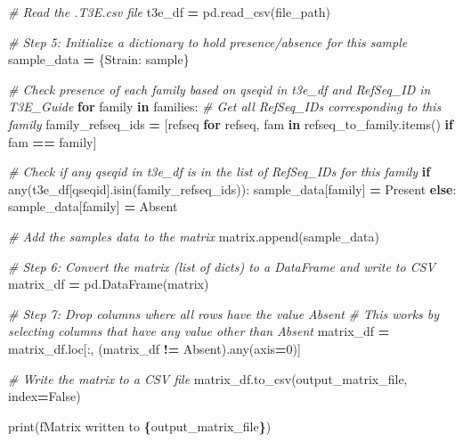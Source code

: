 \documentclass[
]{book}
\newenvironment{Shaded}{\begin{snugshade}}{\end{snugshade}}
\newcommand{\BuiltInTok}[1]{#1}
\newcommand{\CommentTok}[1]{\textcolor[rgb]{0.56,0.35,0.01}{\textit{#1}}}
\newcommand{\ControlFlowTok}[1]{\textcolor[rgb]{0.13,0.29,0.53}{\textbf{#1}}}
\newcommand{\DecValTok}[1]{\textcolor[rgb]{0.00,0.00,0.81}{#1}}
\newcommand{\KeywordTok}[1]{\textcolor[rgb]{0.13,0.29,0.53}{\textbf{#1}}}
\newcommand{\NormalTok}[1]{#1}
\newcommand{\OperatorTok}[1]{\textcolor[rgb]{0.81,0.36,0.00}{\textbf{#1}}}
\newcommand{\SpecialCharTok}[1]{\textcolor[rgb]{0.81,0.36,0.00}{\textbf{#1}}}
\newcommand{\SpecialStringTok}[1]{\textcolor[rgb]{0.31,0.60,0.02}{#1}}
\newcommand{\StringTok}[1]{\textcolor[rgb]{0.31,0.60,0.02}{#1}}
\newcommand{\VariableTok}[1]{\textcolor[rgb]{0.00,0.00,0.00}{#1}}
\begin{document}
\begin{Shaded}
\begin{Highlighting}[]
        \CommentTok{\# Read the .T3E.csv file}
\NormalTok{        t3e\_df }\OperatorTok{=}\NormalTok{ pd.read\_csv(file\_path)}
        
        \CommentTok{\# Step 5: Initialize a dictionary to hold presence/absence for this sample}
\NormalTok{        sample\_data }\OperatorTok{=}\NormalTok{ \{}\StringTok{\textquotesingle{}Strain\textquotesingle{}}\NormalTok{: sample\}}
        
        \CommentTok{\# Check presence of each family based on qseqid in t3e\_df and RefSeq\_ID in T3E\_Guide}
        \ControlFlowTok{for}\NormalTok{ family }\KeywordTok{in}\NormalTok{ families:}
            \CommentTok{\# Get all RefSeq\_IDs corresponding to this family}
\NormalTok{            family\_refseq\_ids }\OperatorTok{=}\NormalTok{ [refseq }\ControlFlowTok{for}\NormalTok{ refseq, fam }\KeywordTok{in}\NormalTok{ refseq\_to\_family.items() }\ControlFlowTok{if}\NormalTok{ fam }\OperatorTok{==}\NormalTok{ family]}
            
            \CommentTok{\# Check if any qseqid in t3e\_df is in the list of RefSeq\_IDs for this family}
            \ControlFlowTok{if} \BuiltInTok{any}\NormalTok{(t3e\_df[}\StringTok{\textquotesingle{}qseqid\textquotesingle{}}\NormalTok{].isin(family\_refseq\_ids)):}
\NormalTok{                sample\_data[family] }\OperatorTok{=} \StringTok{\textquotesingle{}Present\textquotesingle{}}
            \ControlFlowTok{else}\NormalTok{:}
\NormalTok{                sample\_data[family] }\OperatorTok{=} \StringTok{\textquotesingle{}Absent\textquotesingle{}}
        
        \CommentTok{\# Add the sample\textquotesingle{}s data to the matrix}
\NormalTok{        matrix.append(sample\_data)}

\CommentTok{\# Step 6: Convert the matrix (list of dicts) to a DataFrame and write to CSV}
\NormalTok{matrix\_df }\OperatorTok{=}\NormalTok{ pd.DataFrame(matrix)}

\CommentTok{\# Step 7: Drop columns where all rows have the value \textquotesingle{}Absent\textquotesingle{}}
\CommentTok{\# This works by selecting columns that have any value other than \textquotesingle{}Absent\textquotesingle{}}
\NormalTok{matrix\_df }\OperatorTok{=}\NormalTok{ matrix\_df.loc[:, (matrix\_df }\OperatorTok{!=} \StringTok{\textquotesingle{}Absent\textquotesingle{}}\NormalTok{).}\BuiltInTok{any}\NormalTok{(axis}\OperatorTok{=}\DecValTok{0}\NormalTok{)]}

\CommentTok{\# Write the matrix to a CSV file}
\NormalTok{matrix\_df.to\_csv(output\_matrix\_file, index}\OperatorTok{=}\VariableTok{False}\NormalTok{)}

\BuiltInTok{print}\NormalTok{(}\SpecialStringTok{f\textquotesingle{}Matrix written to }\SpecialCharTok{\{}\NormalTok{output\_matrix\_file}\SpecialCharTok{\}}\SpecialStringTok{\textquotesingle{}}\NormalTok{)}
\end{Highlighting}
\end{Shaded}
\end{document}
